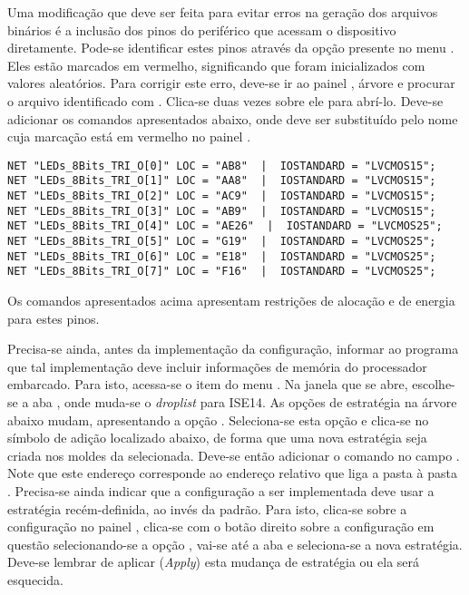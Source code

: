\documentclass[11pt,a4paper,oneside]{book}
\begin{document}
Uma modificação que deve ser feita para evitar erros na geração dos arquivos binários é a inclusão dos pinos do periférico que acessam o dispositivo diretamente.
Pode-se identificar estes pinos através da opção  presente no menu .
Eles estão marcados em vermelho, significando que foram inicializados com valores aleatórios.
Para corrigir este erro, deve-se ir ao painel , árvore  e procurar o arquivo identificado com .
Clica-se duas vezes sobre ele para abrí-lo.
Deve-se adicionar os comandos apresentados abaixo, onde  deve ser substituído pelo nome cuja marcação está em vermelho no painel .
\begin{lstlisting}
NET "LEDs_8Bits_TRI_O[0]" LOC = "AB8"  |  IOSTANDARD = "LVCMOS15";
NET "LEDs_8Bits_TRI_O[1]" LOC = "AA8"  |  IOSTANDARD = "LVCMOS15";
NET "LEDs_8Bits_TRI_O[2]" LOC = "AC9"  |  IOSTANDARD = "LVCMOS15";
NET "LEDs_8Bits_TRI_O[3]" LOC = "AB9"  |  IOSTANDARD = "LVCMOS15";
NET "LEDs_8Bits_TRI_O[4]" LOC = "AE26"  |  IOSTANDARD = "LVCMOS25";
NET "LEDs_8Bits_TRI_O[5]" LOC = "G19"  |  IOSTANDARD = "LVCMOS25";
NET "LEDs_8Bits_TRI_O[6]" LOC = "E18"  |  IOSTANDARD = "LVCMOS25";
NET "LEDs_8Bits_TRI_O[7]" LOC = "F16"  |  IOSTANDARD = "LVCMOS25";
\end{lstlisting}
Os comandos apresentados acima apresentam restrições de alocação e de energia para estes pinos.

Precisa-se ainda, antes da implementação da configuração, informar ao programa que tal implementação deve incluir informações de memória do processador embarcado.
Para isto, acessa-se o item  do menu .
Na janela que se abre, escolhe-se a aba , onde muda-se o \textit{droplist}  para ISE14.
As opções de estratégia na árvore abaixo mudam, apresentando a opção .
Seleciona-se esta opção e clica-se no símbolo de adição localizado abaixo, de forma que uma nova estratégia seja criada nos moldes da selecionada.
Deve-se então adicionar o comando  no campo .
Note que este endereço corresponde ao endereço relativo que liga a pasta  à pasta .
Precisa-se ainda indicar que a configuração a ser implementada deve usar a estratégia recém-definida, ao invés da padrão.
Para isto, clica-se sobre a configuração no painel , clica-se com o botão direito sobre a configuração em questão selecionando-se a opção , vai-se até a aba  e seleciona-se a nova estratégia.
Deve-se lembrar de aplicar (\textit{Apply}) esta mudança de estratégia ou ela será esquecida.
\end{document}
